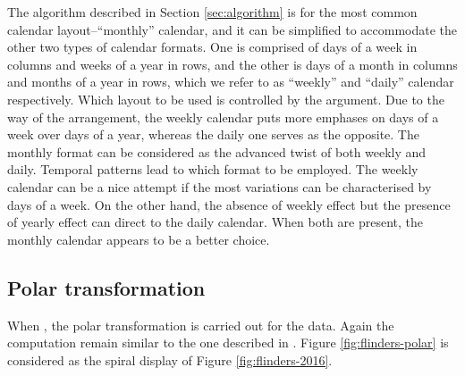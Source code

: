 \documentclass[article]{jss}
\begin{document}
The algorithm described in Section \ref{sec:algorithm} is for the most
common calendar layout--``monthly'' calendar, and it can be simplified
to accommodate the other two types of calendar formats. One is comprised
of days of a week in columns and weeks of a year in rows, and the other
is days of a month in columns and months of a year in rows, which we
refer to as ``weekly'' and ``daily'' calendar respectively. Which layout
to be used is controlled by the  argument. Due to the way
of the arrangement, the weekly calendar puts more emphases on days of a
week over days of a year, whereas the daily one serves as the opposite.
The monthly format can be considered as the advanced twist of both
weekly and daily. Temporal patterns lead to which format to be employed.
The weekly calendar can be a nice attempt if the most variations can be
characterised by days of a week. On the other hand, the absence of
weekly effect but the presence of yearly effect can direct to the daily
calendar. When both are present, the monthly calendar appears to be a
better choice.

\subsection{Polar transformation}\label{polar-transformation}

When , the polar transformation is carried out for
the data. Again the computation remain similar to the one described in
\citet{Wickham2012glyph}. Figure \ref{fig:flinders-polar} is considered
as the spiral display of Figure \ref{fig:flinders-2016}.
\end{document}
